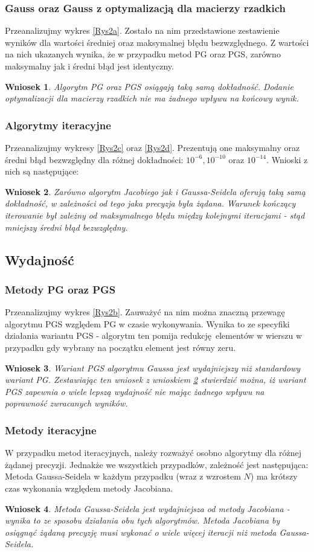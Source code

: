 \documentclass[10pt]{article}
\newtheorem{wn}{Wniosek}
\begin{document}
\subsubsection{Gauss oraz Gauss z optymalizacją dla macierzy rzadkich}
Przeanalizujmy wykres \ref{Rys2a}. Zostało na nim przedstawione zestawienie wyników dla wartości średniej oraz maksymalnej błędu bezwzględnego. Z wartości na nich ukazanych wynika, że w przypadku metod PG oraz PGS, zarówno maksymalny jak i średni błąd jest identyczny.
\begin{wn}
	Algorytm PG oraz PGS osiągają taką samą dokładność. Dodanie optymalizacji dla macierzy rzadkich nie ma żadnego wpływu na końcowy wynik.\label{wn:2}
\end{wn}
\subsubsection{Algorytmy iteracyjne}
Przeanalizujmy wykresy \ref{Rys2c} oraz \ref{Rys2d}. Prezentują one maksymalny oraz średni błąd bezwzględny dla różnej dokładności: $10^{-6},10^{-10}$ oraz $10^{-14}$.
Wnioski z nich są następujące:
\begin{wn}
	Zarówno algorytm Jacobiego jak i Gaussa-Seidela oferują taką samą dokładność, w zależności od tego jaka precyzja była żądana. Warunek kończący iterowanie był zależny od maksymalnego błędu między kolejnymi iteracjami - stąd mniejszy średni błąd bezwzględny. \label{wn:3}
\end{wn}
\subsection{Wydajność}
\subsubsection{Metody PG oraz PGS}
Przeanalizujmy wykres \ref{Rys2b}. Zauważyć na nim można znaczną przewagę algorytmu PGS względem PG w czasie wykonywania. Wynika to ze specyfiki działania wariantu PGS - algorytm ten pomija redukcję elementów w wierszu w przypadku gdy wybrany na początku element jest równy zeru.
\begin{wn}
	Wariant PGS algorytmu Gaussa jest wydajniejszy niż standardowy wariant PG. Zestawiając ten wniosek z wnioskiem \ref{wn:3} stwierdzić można, iż wariant PGS zapewnia o wiele lepszą wydajność nie mając żadnego wpływu na poprawność zwracanych wyników.
	 \label{wn:4}
\end{wn}
\subsubsection{Metody iteracyjne}
W przypadku metod iteracyjnych, należy rozważyć osobno algorytmy dla różnej żądanej precyzji.
Jednakże we wszystkich przypadków, zależność jest następująca: Metoda Gaussa-Seidela w każdym przypadku (wraz z wzrostem $N$) ma krótszy czas wykonania względem metody Jacobiana.
\begin{wn}
	Metoda Gaussa-Seidela jest wydajniejsza od metody Jacobiana - wynika to ze sposobu działania obu tych algorytmów. Metoda Jacobiana by osiągnąć żądaną precyzję musi wykonać o wiele więcej iteracji niż metoda Gaussa-Seidela. \label{wn:5}
\end{wn}
\end{document}
